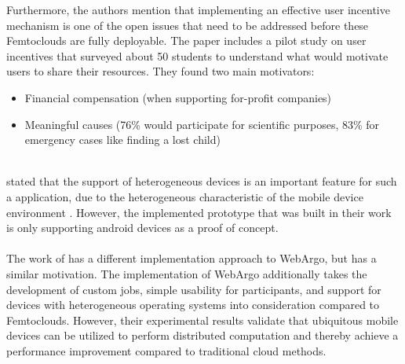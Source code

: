 Furthermore, the authors mention that implementing an effective user incentive mechanism is one of the open issues that need to be addressed before these Femtoclouds are fully deployable. The paper includes a pilot study on user incentives that surveyed about 50 students to understand what would motivate users to share their resources. They found two main motivators:
\begin{itemize}
  \item Financial compensation (when supporting for-profit companies)
  \item Meaningful causes (76\% would participate for scientific purposes, 83\% for emergency cases like finding a lost child)
\end{itemize}
~\\
\citeauthor{relatedwork:mobilecloud} stated that the support of heterogeneous devices is an important feature for such a application, due to the heterogeneous characteristic of the mobile device environment \cite{relatedwork:mobilecloud}. However, the implemented prototype that was built in their work is only supporting android devices as a proof of concept.
\\~\\
The work of \citeauthor{relatedwork:mobilecloud} has a different implementation approach to WebArgo, but has a similar motivation. The implementation of WebArgo additionally takes the development of custom jobs, simple usability for participants, and support for devices with heterogeneous operating systems into consideration compared to Femtoclouds. However, their experimental results validate that ubiquitous mobile devices can be utilized to perform distributed computation and thereby achieve a performance improvement compared to traditional cloud methods.